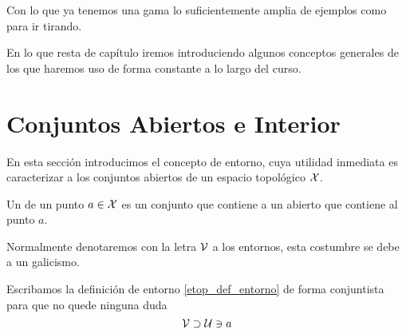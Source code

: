 \begin{exa}[Topologías]
\begin{enumerate}
		
	\end{enumerate}
	Con lo que ya tenemos una gama lo suficientemente amplia de ejemplos como para ir tirando.
\end{exa}
En lo que resta de capítulo iremos introduciendo algunos conceptos generales de los que haremos uso de forma constante a lo largo del curso.
\section{Conjuntos Abiertos e Interior}
\label{etop_entornos}
En esta sección introducimos el concepto de entorno, cuya utilidad inmediata es caracterizar a los conjuntos abiertos de un espacio topológico $\mathcal{X}$.
\begin{defi}
	\label{etop_def_entorno}
	Un  de un punto $a\in\mathcal{X}$ es un conjunto que contiene a un abierto que contiene al punto $a$.
\end{defi}
Normalmente denotaremos con la letra $\mathcal{V}$ a los entornos, esta costumbre se debe a un galicismo. %

Escribamos la definición de entorno \ref{etop_def_entorno} de forma conjuntista para que no quede ninguna duda
\begin{equation}
	\label{etop_eq_entorno}
	\mathcal{V}\supset\mathcal{U}\ni a
\end{equation}

